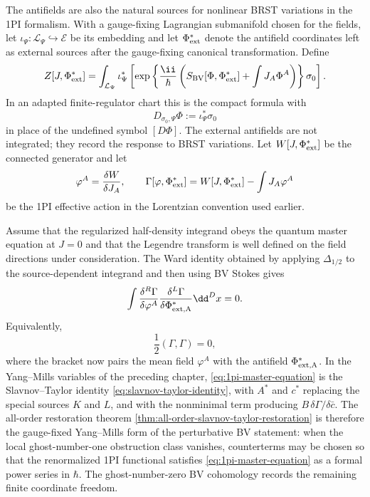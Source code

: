 The antifields are also the natural sources for nonlinear BRST variations in
the 1PI formalism.  With a gauge-fixing Lagrangian submanifold chosen for the
fields, let \(\iota_\Psi:\mathcal L_\Psi\hookrightarrow\mathcal E\) be its
embedding and let \(\Phi^*_{\rm ext}\) denote the antifield coordinates left
as external sources after the gauge-fixing canonical transformation.  Define
\[
  Z[J,\Phi^*_{\rm ext}]
  =
  \int_{\mathcal L_\Psi}
  \iota_\Psi^*
  \left[
  \exp\left\{
  \frac{\ii}{\hbar}
  \left(S_{\rm BV}[\Phi,\Phi^*_{\rm ext}]+\int J_A\Phi^A\right)
  \right\}
  \sigma_0
  \right].
\]
In an adapted finite-regulator chart this is the compact formula with
\[
  D_{\sigma_0,\Psi}\Phi:=\iota_\Psi^*\sigma_0
\]
in place of the undefined symbol \([D\Phi]\).  The external antifields are not
integrated; they record the response to BRST variations.  Let
\(W[J,\Phi^*_{\rm ext}]\) be the connected generator and let
\[
  \varphi^A=\frac{\delta W}{\delta J_A},
  \qquad
  \Gamma[\varphi,\Phi^*_{\rm ext}]
  =
  W[J,\Phi^*_{\rm ext}]-\int J_A\varphi^A
\]
be the 1PI effective action in the Lorentzian convention used earlier.

Assume that the regularized half-density integrand obeys the quantum master
equation at \(J=0\) and that the Legendre transform is well defined on the
field directions under consideration.  The Ward identity obtained by applying
\(\Delta_{1/2}\) to the source-dependent integrand and then using BV Stokes
gives
\[
  \int
  \frac{\delta^R\Gamma}{\delta\varphi^A}
  \frac{\delta^L\Gamma}{\delta\Phi^*_{\rm ext,A}}
  \dd^D x
  =
  0 .
\]
Equivalently,
\begin{equation}
  \frac12(\Gamma,\Gamma)=0,
  \label{eq:1pi-master-equation}
\end{equation}
where the bracket now pairs the mean field \(\varphi^A\) with the antifield
\(\Phi^*_{\rm ext,A}\).  In the Yang--Mills variables of the preceding chapter,
\eqref{eq:1pi-master-equation} is the Slavnov--Taylor identity
\eqref{eq:slavnov-taylor-identity}, with \(A^*\) and \(c^*\) replacing the
special sources \(K\) and \(L\), and with the nonminimal term producing
\(B\,\delta\Gamma/\delta\bar c\).
The all-order restoration theorem
\ref{thm:all-order-slavnov-taylor-restoration} is therefore the gauge-fixed
Yang--Mills form of the perturbative BV statement: when the local
ghost-number-one obstruction class vanishes, counterterms may be chosen so that
the renormalized 1PI functional satisfies \eqref{eq:1pi-master-equation} as a
formal power series in \(\hbar\).  The ghost-number-zero BV cohomology records
the remaining finite coordinate freedom.


